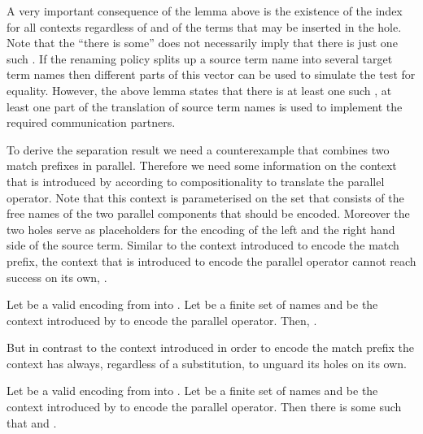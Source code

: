 \documentclass[final,copyright,creativecommons]{eptcs}
\begin{document}
\noindent
A very important consequence of the lemma above is the existence of the index  for all contexts  regardless of  and of the terms that may be inserted in the hole. Note that the ``there is some'' does not necessarily imply that there is just one such . If the renaming policy splits up a source term name into several target term names then different parts of this vector can be used to simulate the test for equality. However, the above lemma states that there is at least one such , \ie at least one part of the translation of source term names is used to implement the required communication partners.

To derive the separation result we need a counterexample that combines two match prefixes in parallel.
Therefore we need some information on the context  that is introduced by  according to compositionality to translate the parallel operator. Note that this context is parameterised on the set  that consists of the free names of the two parallel components that should be encoded. Moreover the two holes serve as placeholders for the encoding of the left and the right hand side of the source term.
Similar to the context introduced to encode the match prefix, the context that is introduced to encode the parallel operator cannot reach success on its own, \ie .

\begin{lemma}
	\label{lem:parContextCannotReachSuccess}
	Let \encod be a valid encoding from \piT into \piNM.
	Let  be a finite set of names
	and  be the context introduced by  to encode the parallel operator.
	Then, .
\end{lemma}

But in contrast to the context introduced in order to encode the match prefix the context  has always, \ie regardless of a substitution, to unguard its holes on its own.

\begin{lemma}
	\label{lem:parContextUnguard}
	Let \encod be a valid encoding from \piT into \piNM.
	Let  be a finite set of names
	and  be the context introduced by  to encode the parallel operator.
	Then there is some  such that  and .
\end{lemma}
\end{document}
